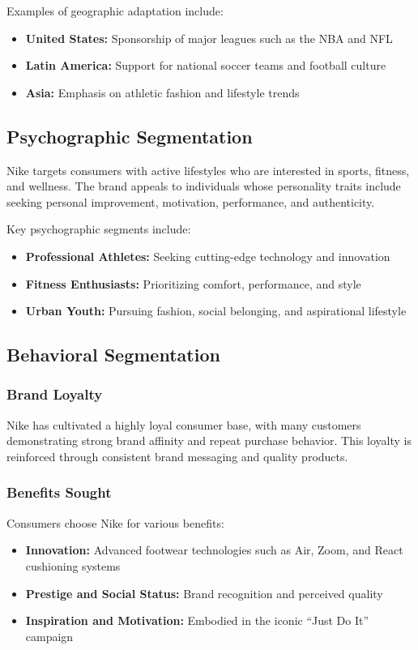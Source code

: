 \documentclass[letterpaper, 12pt]{article}
\begin{document}
Examples of geographic adaptation include:
\begin{itemize}
    \item \textbf{United States:} Sponsorship of major leagues such as the NBA and NFL
    \item \textbf{Latin America:} Support for national soccer teams and football culture
    \item \textbf{Asia:} Emphasis on athletic fashion and lifestyle trends
\end{itemize}

\subsection{Psychographic Segmentation}

Nike targets consumers with active lifestyles who are interested in sports, fitness, and wellness. The brand appeals to individuals whose personality traits include seeking personal improvement, motivation, performance, and authenticity.

Key psychographic segments include:
\begin{itemize}
    \item \textbf{Professional Athletes:} Seeking cutting-edge technology and innovation
    \item \textbf{Fitness Enthusiasts:} Prioritizing comfort, performance, and style
    \item \textbf{Urban Youth:} Pursuing fashion, social belonging, and aspirational lifestyle
\end{itemize}

\subsection{Behavioral Segmentation}

\subsubsection{Brand Loyalty}
Nike has cultivated a highly loyal consumer base, with many customers demonstrating strong brand affinity and repeat purchase behavior. This loyalty is reinforced through consistent brand messaging and quality products.

\subsubsection{Benefits Sought}
Consumers choose Nike for various benefits:
\begin{itemize}
    \item \textbf{Innovation:} Advanced footwear technologies such as Air, Zoom, and React cushioning systems
    \item \textbf{Prestige and Social Status:} Brand recognition and perceived quality
    \item \textbf{Inspiration and Motivation:} Embodied in the iconic ``Just Do It'' campaign
\end{itemize}
\end{document}
